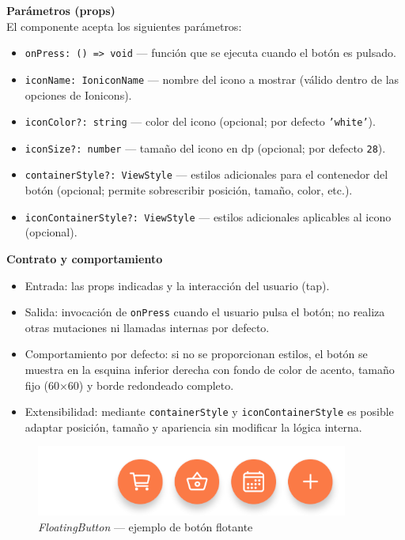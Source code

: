 \documentclass[twoside, openright, 11pt]{report}
\begin{document}
						\textbf{Parámetros (props)\\}
						El componente acepta los siguientes parámetros:
						\begin{itemize}
							\item \texttt{onPress: () => void} — función que se ejecuta cuando el botón es pulsado.
							\item \texttt{iconName: IoniconName} — nombre del icono a mostrar (válido dentro de las opciones de Ionicons).
							\item \texttt{iconColor?: string} — color del icono (opcional; por defecto \texttt{'white'}).
							\item \texttt{iconSize?: number} — tamaño del icono en dp (opcional; por defecto \texttt{28}).
							\item \texttt{containerStyle?: ViewStyle} — estilos adicionales para el contenedor del botón (opcional; permite sobrescribir posición, tamaño, color, etc.).
							\item \texttt{iconContainerStyle?: ViewStyle} — estilos adicionales aplicables al icono (opcional).
						\end{itemize}
						
						\textbf{Contrato y comportamiento\\}
						\begin{itemize}
							\item Entrada: las props indicadas y la interacción del usuario (tap).
							\item Salida: invocación de \texttt{onPress} cuando el usuario pulsa el botón; no realiza otras mutaciones ni llamadas internas por defecto.
							\item Comportamiento por defecto: si no se proporcionan estilos, el botón se muestra en la esquina inferior derecha con fondo de color de acento, tamaño fijo (60×60) y borde redondeado completo.
							\item Extensibilidad: mediante \texttt{containerStyle} y \texttt{iconContainerStyle} es posible adaptar posición, tamaño y apariencia sin modificar la lógica interna.
						\end{itemize}
						
						\begin{figure}[H]
							\centering
							\includegraphics{imagenes/ButtonGroup}
							\caption{\textit{FloatingButton} — ejemplo de botón flotante}
							\label{fig:ButtonGroup}
						\end{figure}
					
\end{document}
